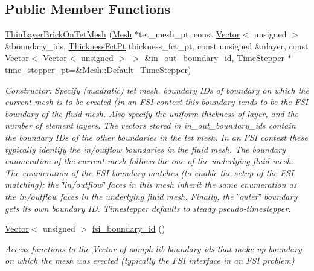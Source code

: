 \subsection*{Public Member Functions}
\begin{DoxyCompactItemize}
\item 
\hyperlink{classoomph_1_1ThinLayerBrickOnTetMesh_ad452469bc94bff203012e68e80ee543c}{Thin\+Layer\+Brick\+On\+Tet\+Mesh} (\hyperlink{classoomph_1_1Mesh}{Mesh} $\ast$tet\+\_\+mesh\+\_\+pt, const \hyperlink{classoomph_1_1Vector}{Vector}$<$ unsigned $>$ \&boundary\+\_\+ids, \hyperlink{classoomph_1_1ThinLayerBrickOnTetMesh_aed34f7d1e9a5c6b5f3e220cb5bdf4550}{Thickness\+Fct\+Pt} thickness\+\_\+fct\+\_\+pt, const unsigned \&nlayer, const \hyperlink{classoomph_1_1Vector}{Vector}$<$ \hyperlink{classoomph_1_1Vector}{Vector}$<$ unsigned $>$ $>$ \&\hyperlink{classoomph_1_1ThinLayerBrickOnTetMesh_a3cfd55eb5bbd6801e9d4cd271e602cd8}{in\+\_\+out\+\_\+boundary\+\_\+id}, \hyperlink{classoomph_1_1TimeStepper}{Time\+Stepper} $\ast$time\+\_\+stepper\+\_\+pt=\&\hyperlink{classoomph_1_1Mesh_a12243d0fee2b1fcee729ee5a4777ea10}{Mesh\+::\+Default\+\_\+\+Time\+Stepper})
\begin{DoxyCompactList}\small\item\em Constructor\+: Specify (quadratic) tet mesh, boundary I\+Ds of boundary on which the current mesh is to be erected (in an F\+SI context this boundary tends to be the F\+SI boundary of the fluid mesh. Also specify the uniform thickness of layer, and the number of element layers. The vectors stored in in\+\_\+out\+\_\+boundary\+\_\+ids contain the boundary I\+Ds of the other boundaries in the tet mesh. In an F\+SI context these typically identify the in/outflow boundaries in the fluid mesh. The boundary enumeration of the current mesh follows the one of the underlying fluid mesh\+: The enumeration of the F\+SI boundary matches (to enable the setup of the F\+SI matching); the \char`\"{}in/outflow\char`\"{} faces in this mesh inherit the same enumeration as the in/outflow faces in the underlying fluid mesh. Finally, the \char`\"{}outer\char`\"{} boundary gets its own boundary ID. Timestepper defaults to steady pseudo-\/timestepper. \end{DoxyCompactList}\item 
\hyperlink{classoomph_1_1Vector}{Vector}$<$ unsigned $>$ \hyperlink{classoomph_1_1ThinLayerBrickOnTetMesh_ada2e50ab8dfb631a26fc4111eb2fe9ad}{fsi\+\_\+boundary\+\_\+id} ()
\begin{DoxyCompactList}\small\item\em Access functions to the \hyperlink{classoomph_1_1Vector}{Vector} of oomph-\/lib boundary ids that make up boundary on which the mesh was erected (typically the F\+SI interface in an F\+SI problem) \end{DoxyCompactList}\item 

\end{DoxyCompactItemize}
